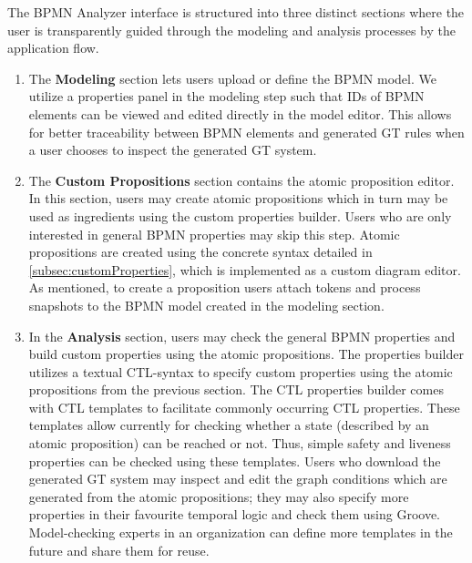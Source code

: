 \documentclass{lmcs} %
\begin{document}

The BPMN Analyzer interface is structured into three distinct sections where the user is transparently guided through the modeling and analysis processes by the application flow.

\begin{enumerate}
  \item The \textbf{Modeling} section lets users upload or define the BPMN model.
  We utilize a properties panel in the modeling step such that IDs of BPMN elements can be viewed and edited directly in the model editor. %
  This allows for better traceability between BPMN elements and generated GT rules when a user chooses to inspect the generated GT system.
  \item The \textbf{Custom Propositions} section contains the atomic proposition editor.
  In this section, users may create atomic propositions which in turn may be used as ingredients using the custom properties builder.
  Users who are only interested in general BPMN properties may skip this step.
  Atomic propositions are created using the concrete syntax detailed in \autoref{subsec:customProperties}, which is implemented as a custom diagram editor.
  As mentioned, to create a proposition users attach tokens and process snapshots to the BPMN model created in the modeling section.
  \item In the \textbf{Analysis} section, users may check the general BPMN properties and build custom properties using the atomic propositions. 
  The properties builder utilizes a textual CTL-syntax to specify custom properties using the atomic propositions from the previous section.
  The CTL properties builder comes with CTL templates to facilitate commonly occurring CTL properties.
  These templates allow currently for checking whether a state (described by an atomic proposition) can be reached or not.
  Thus, simple safety and liveness properties can be checked using these templates.
  Users who download the generated GT system may inspect and edit the graph conditions which are generated from the atomic propositions; they may also specify more properties in their favourite temporal logic and check them using Groove.
  Model-checking experts in an organization can define more templates in the future and share them for reuse. 

\end{enumerate}
\end{document}
